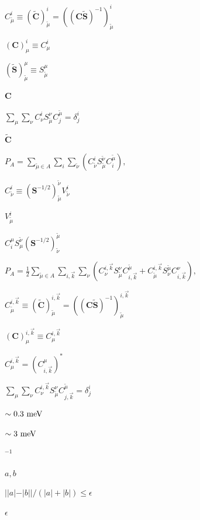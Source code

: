 \documentclass{article}
\begin{document}
$ C_{\tilde{\mu}}^i \equiv \left(\mathbf{\tilde{C}}\right)_{\tilde{\mu}}^i = \left(\left(\mathbf{C} \mathbf{\tilde{S}}\right)^{-1}\right)_{\tilde{\mu}}^i $
\pagebreak

$ \left(\mathbf{C}\right)^i_\mu \equiv C^i_\mu $
\pagebreak

$ \left(\mathbf{\tilde{S}}\right)^\mu_{\tilde{\mu}} \equiv S^\mu_{\tilde{\mu}} $
\pagebreak

$ \mathbf{C} $
\pagebreak

$ \sum_{\mu} \sum_\nu C^i_{\nu} S^{\nu}_{\tilde{\mu}} C^{\tilde{\mu}}_j = \delta^i_j $
\pagebreak

$ \mathbf{\tilde{C}} $
\pagebreak

$ P_A = \sum_{\tilde{\mu} \in A} \sum_i \sum_{\tilde{\nu}} \left( C^i_{\tilde{\nu}} S^{\tilde{\nu}}_{\tilde{\mu}} C^{\tilde{\mu}}_i \right), $
\pagebreak

$ C_{\tilde{\nu}}^i \equiv (\mathbf{S}^{-1/2})^{\tilde{\nu}}_{\tilde{\mu}} V^i_{\tilde{\nu}} $
\pagebreak

$ V^i_{\tilde{\mu}} $
\pagebreak

$ C_i^\mu S^{\tilde{\nu}}_{\mu} (\mathbf{S}^{-1/2})^{\tilde{\mu}}_{\tilde{\nu}} $
\pagebreak

$ P_A = \frac{1}{2} \sum_{\tilde{\mu} \in A} \sum_{i,\vec{k}} \sum_\nu \left( C^{i,\vec{k}}_{\nu} S^{\nu}_{\tilde{\mu}} C^{\tilde{\mu}}_{i,\vec{k}} + C_{\tilde{\mu}}^{i,\vec{k}} S_{\nu}^{\tilde{\mu}} C_{i,\vec{k}}^{\nu} \right), $
\pagebreak

$ C_{\tilde{\mu}}^{i,\vec{k}} \equiv \left(\mathbf{\tilde{C}}\right)_{\tilde{\mu}}^{i,\vec{k}} = \left(\left(\mathbf{C} \mathbf{\tilde{S}}\right)^{-1}\right)_{\tilde{\mu}}^{i,\vec{k}} $
\pagebreak

$ \left(\mathbf{C}\right)^{i,\vec{k}}_\mu \equiv C^{i,\vec{k}}_\mu $
\pagebreak

$ C^{i,\vec{k}}_\mu = \left( C_{i,\vec{k}}^\mu \right)^* $
\pagebreak

$ \sum_{\mu} \sum_\nu C^{i,\vec{k}}_{\nu} S^{\nu}_{\tilde{\mu}} C^{\tilde{\mu}}_{j,\vec{k}} = \delta^i_j $
\pagebreak

$ \sim 0.3~{\rm meV} $
\pagebreak

$ \sim 3~{\rm meV} $
\pagebreak

$^{-1}$
\pagebreak

$ a,b $
\pagebreak

$ ||a|-|b||/(|a|+|b|) \leq \epsilon $
\pagebreak

$ \epsilon $
\pagebreak
\end{document}
